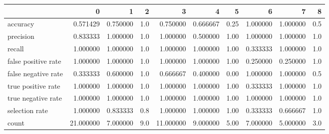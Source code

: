 \begin{tabular}{lrrrrrrrrr}
\toprule
{} &          0 &         1 &    2 &          3 &         4 &     5 &         6 &         7 &    8 \\
\midrule
accuracy            &   0.571429 &  0.750000 &  1.0 &   0.750000 &  0.666667 &  0.25 &  1.000000 &  1.000000 &  0.5 \\
precision           &   0.833333 &  1.000000 &  1.0 &   1.000000 &  0.500000 &  1.00 &  1.000000 &  1.000000 &  1.0 \\
recall              &   1.000000 &  1.000000 &  1.0 &   1.000000 &  1.000000 &  1.00 &  0.333333 &  1.000000 &  1.0 \\
false positive rate &   1.000000 &  1.000000 &  1.0 &   1.000000 &  1.000000 &  1.00 &  0.250000 &  0.250000 &  1.0 \\
false negative rate &   0.333333 &  0.600000 &  1.0 &   0.666667 &  0.400000 &  0.00 &  1.000000 &  1.000000 &  0.5 \\
true positive rate  &   1.000000 &  1.000000 &  1.0 &   1.000000 &  1.000000 &  1.00 &  0.333333 &  1.000000 &  1.0 \\
true negative rate  &   1.000000 &  1.000000 &  1.0 &   1.000000 &  1.000000 &  1.00 &  1.000000 &  1.000000 &  1.0 \\
selection rate      &   1.000000 &  0.833333 &  0.8 &   1.000000 &  1.000000 &  1.00 &  0.333333 &  0.666667 &  1.0 \\
count               &  21.000000 &  7.000000 &  9.0 &  11.000000 &  9.000000 &  5.00 &  7.000000 &  5.000000 &  3.0 \\
\bottomrule
\end{tabular}
